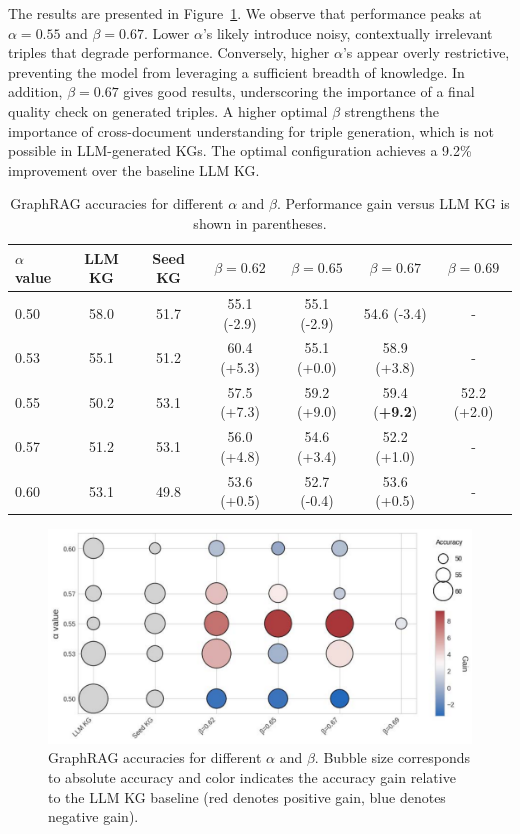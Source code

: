 \documentclass[10pt]{article}
\begin{document}
The results are presented in Figure~\ref{fig:ablations}. We observe that performance peaks at $\alpha = 0.55$ and $\beta = 0.67$. Lower $\alpha$'s likely introduce noisy, contextually irrelevant triples that degrade performance. Conversely, higher $\alpha$'s appear overly restrictive, preventing the model from leveraging a sufficient breadth of knowledge. In addition, $\beta = 0.67$ gives good results, underscoring the importance of a final quality check on generated triples. A higher optimal $\beta$ strengthens the importance of cross-document understanding for triple generation, which is not possible in LLM-generated KGs. The optimal configuration achieves a 9.2\% improvement over the baseline LLM KG. 

\begin{table}[t]
  \centering
  \caption{GraphRAG accuracies for different $\alpha$ and $\beta$. Performance gain versus LLM KG is shown in parentheses.}
  \label{tab:alpha_beta}
  \small
  \begingroup
  \setlength{\tabcolsep}{6pt}
  \begin{tabular}{l c c c c c c}
    \toprule
    \rowcolor{gray!30}
    \textbf{$\alpha$ value} & \textbf{LLM KG} & \textbf{Seed KG} & \textbf{$\beta=0.62$} & \textbf{$\beta=0.65$} & \textbf{$\beta=0.67$} & \textbf{$\beta=0.69$} \\
    \midrule
    0.50 & 58.0 & 51.7 & 55.1 (-2.9) & 55.1 (-2.9)& 54.6 (-3.4)& - \\   
    0.53 & 55.1 & 51.2 & 60.4 (+5.3)& 55.1 (+0.0)& 58.9 (+3.8)& - \\
    0.55 & 50.2 & 53.1 & 57.5 (+7.3)& 59.2 (+9.0)& 59.4 (\textbf{+9.2})& 52.2 (+2.0)\\   
    0.57 & 51.2 & 53.1 & 56.0 (+4.8)& 54.6 (+3.4)& 52.2 (+1.0)& - \\   
    0.60 & 53.1 & 49.8 & 53.6 (+0.5)& 52.7 (-0.4)& 53.6 (+0.5)& - \\   
    \bottomrule
  \end{tabular}
  \endgroup
\end{table}

\begin{figure}[t!]
\centering
\includegraphics[width=0.9\linewidth]{pictures/ablation.pdf}
\caption{GraphRAG accuracies for different $\alpha$ and $\beta$. Bubble size corresponds to absolute accuracy and color indicates the accuracy gain relative to the LLM KG baseline (red denotes positive gain, blue denotes negative gain).}
\label{fig:ablations}
\end{figure}
\end{document}
